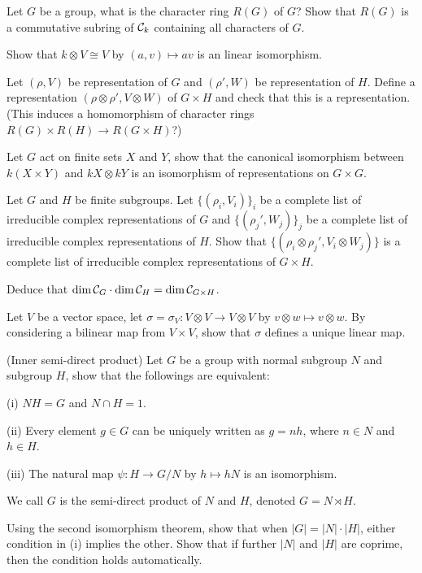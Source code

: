 \begin{question}{33}
	Let $G$ be a group, what is the character ring $R(G)$ of $G$? Show that $R(G)$ is a commutative subring of $\mathcal{C}_k$ containing all characters of $G$.
	
	Show that $k \otimes V \cong V$ by $(a,v) \mapsto av$ is an linear isomorphism.
	
	Let $(\rho,V)$ be representation of $G$ and $(\rho',W)$ be representation of $H$. Define a representation $(\rho \otimes \rho',V \otimes W)$ of $G \times H$ and check that this is a representation. (This induces a homomorphism of character rings $R(G) \times R(H) \rightarrow R(G \times H)$?)
	
	Let $G$ act on finite sets $X$ and $Y$, show that the canonical isomorphism between $k(X \times Y)$ and $kX \otimes kY$ is an isomorphism of representations on $G \times G$.
\end{question}

\begin{question}{34}
	Let $G$ and $H$ be finite subgroups. Let $\{(\rho_i,V_i)\}_i$ be a complete list of irreducible complex representations of $G$ and $\{(\rho_j',W_j)\}_j$ be a complete list of irreducible complex representations of $H$. Show that $\{(\rho_i \otimes \rho_j', V_i \otimes W_j)\}$ is a complete list of irreducible complex representations of $G \times H$. 
	
	Deduce that $\dim \mathcal{C}_G \cdot \dim  \mathcal{C}_H = \dim \mathcal{C}_{G \times H}$.
\end{question}


\begin{question}{35}
	Let $V$ be a vector space, let $\sigma = \sigma_V : V \otimes V \rightarrow V \otimes V$ by $v \otimes w \mapsto v \otimes w$. By considering a bilinear map from $V \times V$, show that $\sigma$ defines a unique linear map.
\end{question}

\begin{theorem}{(Inner semi-direct product)}
	Let $G$ be a group with normal subgroup $N$ and subgroup $H$, show that the followings are equivalent:
	
	(i) $NH = G$ and $N \cap H = 1$.
	
	(ii) Every element $g \in G$ can be uniquely written as $g = nh$,  where $n \in N$ and $h \in H$.
	
	(iii) The natural map $\psi: H \rightarrow G/N$ by $h \mapsto hN$ is an isomorphism.
	
	\bigskip
	
	We call $G$ is the semi-direct product of $N$ and $H$, denoted $G = N \rtimes H$.
	
	Using the second isomorphism theorem, show that when $|G| = |N| \cdot |H|$, either condition in (i) implies the other. Show that if further $|N|$ and $|H|$ are coprime, then the condition holds automatically.
\end{theorem}

